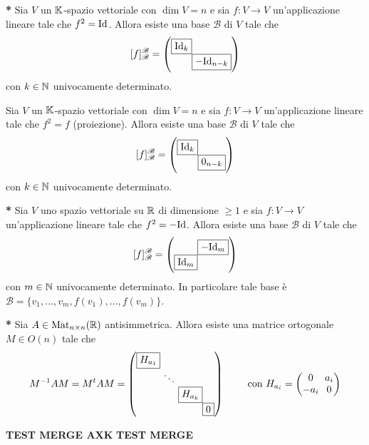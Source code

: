 
\begin{thm} \textbf{*}
	Sia $ V $ un $ \mathbb{K} $-spazio vettoriale con $ \dim{V} = n $ e sia $ f \colon V \to V $ un'applicazione lineare tale che $ f^{2} = \mathrm{Id} $. Allora esiste una base $ \mathscr{B} $ di $ V $ tale che 
	\[[f]_{\mathscr{B}}^{\mathscr{B}} = 
	\setlength{\arraycolsep}{0pt}
	\begin{pmatrix}
	\fbox{$ \Id_k $} & \\
	& \fbox{$ -\Id_{n - k} $}
	\end{pmatrix}\]
	con $ k \in \mathbb{N} $ univocamente determinato.
\end{thm}

\begin{thm}
	Sia $ V $ un $ \mathbb{K} $-spazio vettoriale con $ \dim{V} = n $ e sia $ f \colon V \to V $ un'applicazione lineare tale che $ f^{2} = f $ (proiezione). Allora esiste una base $ \mathscr{B} $ di $ V $ tale che 
	\[[f]_{\mathscr{B}}^{\mathscr{B}} = 
	\setlength{\arraycolsep}{0pt}
	\begin{pmatrix}
	\fbox{$ \Id_k $} & \\
	& \fbox{$ 0_{n - k} $}
	\end{pmatrix}\]
	con $ k \in \mathbb{N} $ univocamente determinato.
\end{thm}

\begin{thm} \textbf{*}
	Sia $ V $ uno spazio vettoriale su $ \mathbb{R} $ di dimensione $ \geq 1 $ e sia $ f \colon V \to V $ un'applicazione lineare tale che $ f^{2} = - \mathrm{Id} $. Allora esiste una base $ \mathscr{B} $ di $ V $ tale che 
	\[[f]_{\mathscr{B}}^{\mathscr{B}} = 
	\setlength{\arraycolsep}{0pt}
	\begin{pmatrix}
	& \fbox{$ -\Id_m $}\\
	\fbox{$ \Id_m $} & 
	\end{pmatrix}\]
	con $ m \in \mathbb{N} $ univocamente determinato. In particolare tale base è $ \mathscr{B} = \{v_1, \ldots, v_m, f(v_1), \ldots, f(v_m)\} $.
\end{thm}

\begin{thm} \textbf{*}
	Sia $ A \in \mathrm{Mat}_{n \times n}(\mathbb{R}) $ antisimmetrica. Allora esiste una matrice ortogonale $ M \in O(n) $ tale che 
	\[M^{-1} A M = M^{t} A M = 
	\setlength{\arraycolsep}{0pt}
	\begin{pmatrix}
	\fbox{$ H_{a_1} $} & & &\\
	& \ \ddots \ & & \\
	& & \fbox{$ H_{a_k} $} & \\
	& & & \fbox{$ 0 $}
	\end{pmatrix}
	\qquad
	\text{ con }
	H_{a_i} = 
	\setlength{\arraycolsep}{3pt}
	\begin{pmatrix}
	0 & a_{i} \\
	-a_{i} & 0
	\end{pmatrix}\]
\end{thm}


\begin{center}
	\textbf{TEST MERGE AXK}
\hspace{5cm}
	\textbf{TEST MERGE}
\end{center}